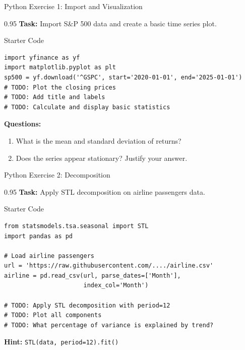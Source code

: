 \documentclass[9pt, aspectratio=169, t]{beamer}
\begin{document}
\begin{frame}[fragile]{Python Exercise 1: Import and Visualization}
    \begin{cminipage}{0.95\textwidth}
    \textbf{Task:} Import S\&P 500 data and create a basic time series plot.
    \vspace{0.2cm}
    \begin{block}{Starter Code}
    \footnotesize
    \begin{verbatim}
import yfinance as yf
import matplotlib.pyplot as plt
sp500 = yf.download('^GSPC', start='2020-01-01', end='2025-01-01')
# TODO: Plot the closing prices
# TODO: Add title and labels
# TODO: Calculate and display basic statistics
    \end{verbatim}
    \end{block}
    \textbf{Questions:}
    \begin{enumerate}\setlength{\itemsep}{0pt}
        \item What is the mean and standard deviation of returns?
        \item Does the series appear stationary? Justify your answer.
    \end{enumerate}

    \end{cminipage}
\end{frame}

\begin{frame}[fragile]{Python Exercise 2: Decomposition}
    \begin{cminipage}{0.95\textwidth}
    \textbf{Task:} Apply STL decomposition on airline passengers data.

    \vspace{0.3cm}

    \begin{block}{Starter Code}
    \small
    \begin{verbatim}
from statsmodels.tsa.seasonal import STL
import pandas as pd

# Load airline passengers
url = 'https://raw.githubusercontent.com/..../airline.csv'
airline = pd.read_csv(url, parse_dates=['Month'],
                      index_col='Month')

# TODO: Apply STL decomposition with period=12
# TODO: Plot all components
# TODO: What percentage of variance is explained by trend?
    \end{verbatim}
    \end{block}

    \textbf{Hint:} \texttt{STL(data, period=12).fit()}
    \end{cminipage}
\end{frame}
\end{document}
